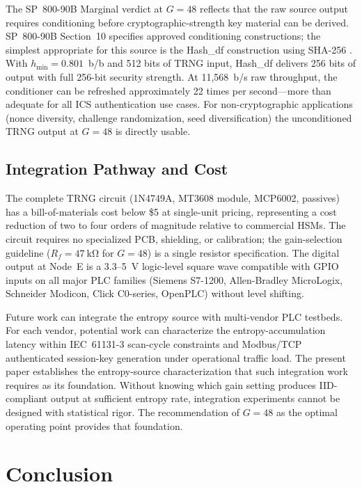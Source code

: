 \documentclass[conference]{IEEEtran}
\newcommand{\hmin}{\ensuremath{h_{\min}}}
\newcommand{\Rf}{\ensuremath{R_f}}
\begin{document}
The SP~800-90B Marginal verdict at $G=48$ reflects that the raw
source output requires conditioning before cryptographic-strength key
material can be derived. SP~800-90B Section~10 specifies approved
conditioning constructions; the simplest appropriate for this source
is the Hash\_df construction using SHA-256 \cite{nist80090a}. With $\hmin=0.801$~b/b
and 512 bits of TRNG input, Hash\_df delivers 256 bits of output with
full 256-bit security strength. At 11{,}568~b/s raw throughput, the
conditioner can be refreshed approximately 22 times per
second---more than adequate for all ICS authentication use cases. For
non-cryptographic applications (nonce diversity, challenge
randomization, seed diversification) the unconditioned TRNG output at
$G=48$ is directly usable.

\subsection{Integration Pathway and Cost}

The complete TRNG circuit (1N4749A, MT3608 module, MCP6002, passives)
has a bill-of-materials cost below \$5 at single-unit
pricing, representing a cost reduction of two to four orders of
magnitude relative to commercial HSMs. The circuit requires no
specialized PCB, shielding, or calibration; the gain-selection
guideline ($\Rf=\SI{47}{\kilo\ohm}$ for $G=48$) is a single resistor
specification. The digital output at Node~E is a 3.3--5~V
logic-level square wave compatible with GPIO inputs on all major PLC
families (Siemens S7-1200, Allen-Bradley MicroLogix, Schneider
Modicon, Click C0-series, OpenPLC) without level shifting.

Future work can integrate the entropy source with multi-vendor PLC testbeds. For each vendor, potential work can 
characterize the entropy-accumulation latency within IEC~61131-3
scan-cycle constraints and Modbus/TCP authenticated session-key
generation under operational traffic load. The present paper
establishes the entropy-source characterization that such integration
work requires as its foundation. Without knowing which gain setting
produces IID-compliant output at sufficient entropy rate, integration
experiments cannot be designed with statistical rigor. The
recommendation of $G=48$ as the optimal operating point provides that
foundation.

\section{Conclusion}\label{sec:conclusion}
\end{document}
